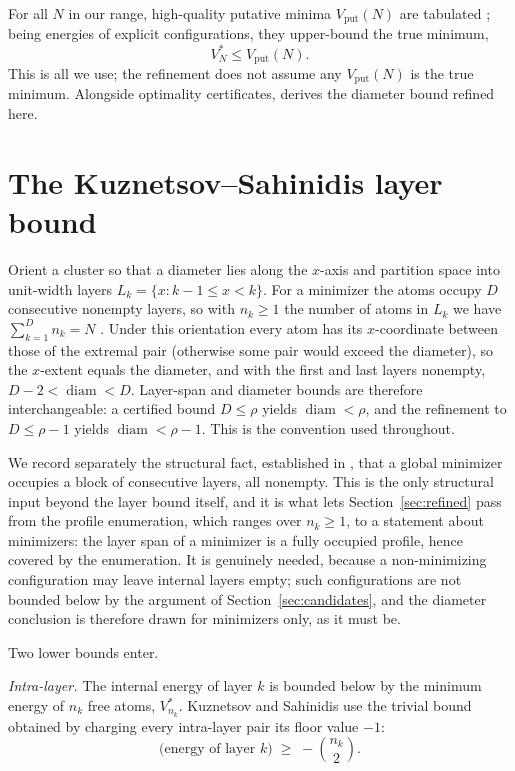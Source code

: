 \documentclass[11pt]{article}
\theoremstyle{remark}
\newcommand{\vput}{\mathrm{put}}
\newcommand{\diam}{\operatorname{diam}}
\begin{document}
For all $N$ in our range, high-quality putative minima $V_\vput(N)$ are tabulated \cite{leary1997,northby1987,walesdoye1997,romero1999}; being energies of explicit configurations, they upper-bound the true minimum,
\begin{equation}\label{eq:put}
V^*_N \le V_\vput(N).
\end{equation}
This is all we use; the refinement does not assume any $V_\vput(N)$ is the true minimum. Alongside optimality certificates, \cite{ks2025} derives the diameter bound refined here.

\section{The Kuznetsov--Sahinidis layer bound}\label{sec:ks}

Orient a cluster so that a diameter lies along the $x$-axis and partition space into unit-width layers $L_k=\{x: k-1\le x<k\}$. For a minimizer the atoms occupy $D$ consecutive nonempty layers, so with $n_k\ge 1$ the number of atoms in $L_k$ we have $\sum_{k=1}^D n_k=N$ \cite{ks2025}. Under this orientation every atom has its $x$-coordinate between those of the extremal pair (otherwise some pair would exceed the diameter), so the $x$-extent equals the diameter, and with the first and last layers nonempty, $D-2<\diam<D$. Layer-span and diameter bounds are therefore interchangeable: a certified bound $D\le\rho$ yields $\diam<\rho$, and the refinement to $D\le\rho-1$ yields $\diam<\rho-1$. This is the convention used throughout.

We record separately the structural fact, established in \cite{ks2025}, that a global minimizer occupies a block of consecutive layers, all nonempty. This is the only structural input beyond the layer bound itself, and it is what lets Section~\ref{sec:refined} pass from the profile enumeration, which ranges over $n_k\ge 1$, to a statement about minimizers: the layer span of a minimizer is a fully occupied profile, hence covered by the enumeration. It is genuinely needed, because a non-minimizing configuration may leave internal layers empty; such configurations are not bounded below by the argument of Section~\ref{sec:candidates}, and the diameter conclusion is therefore drawn for minimizers only, as it must be.

Two lower bounds enter.

\emph{Intra-layer.} The internal energy of layer $k$ is bounded below by the minimum energy of $n_k$ free atoms, $V^*_{n_k}$. Kuznetsov and Sahinidis use the trivial bound obtained by charging every intra-layer pair its floor value $-1$:
\begin{equation}\label{eq:intra}
\text{(energy of layer $k$)} \;\ge\; -\binom{n_k}{2}.
\end{equation}
\end{document}
